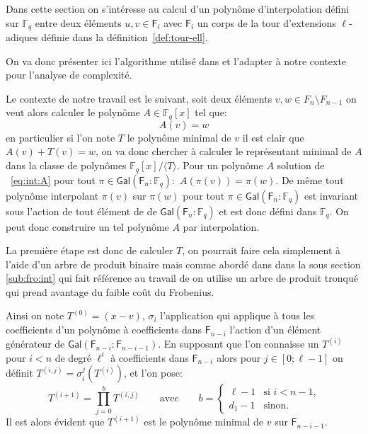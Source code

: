 \documentclass[10pt,a4paper]{book}
\theoremstyle{plain}
\theoremstyle{definition}
\theoremstyle{definition}
\theoremstyle{definition}
\theoremstyle{definition}
\theoremstyle{remark}
\theoremstyle{remark}
\theoremstyle{definition}
\begin{document}
Dans cette section on s'intéresse au calcul d'un polynôme d'interpolation défini
 sur $\mathbb{F}_q$ entre deux éléments $u,v \in \mathsf{F}_i$ avec 
 $\mathsf{F}_i$ un corps de la tour d'extensions $\ell$-adiques 
  définie dans la définition~\ref{def:tour-ell}.  
  
  
 On va donc présenter ici l'algorithme utilisé dans \cite[8.7]{DeFeo10} et
 l'adapter à notre contexte pour l'analyse de complexité. 


Le contexte de notre travail est le suivant, soit deux éléments $v,w \in F_n
\setminus F_{n-1}$ on veut alors calculer le polynôme $A \in \mathbb{F}_q[x]$ 
tel que:
\begin{equation}
\label{eq:int:A}
A(v)=w
\end{equation}
en particulier si l'on note $T$ le polynôme minimal de $v$ il est clair que 
 $A(v)+T(v)=w$, on va donc chercher à calculer le représentant minimal de 
$A$ dans la classe de polynômes $\mathbb{F}_q[x]/ \langle T \rangle$.
Pour un polynôme $A$ solution de ~\ref{eq:int:A} pour tout 
$\pi \in \mathsf{Gal}(\mathsf{F}_n : \mathbb{F}_q):$ $A(\pi(v))=\pi(w)$. De même
tout polynôme interpolant $\pi(v)$ sur $\pi(w)$ pour tout 
$\pi \in \mathsf{Gal}(\mathsf{F}_n : \mathbb{F}_q)$ est invariant sous l'action
de tout élément de de $\mathsf{Gal}(\mathsf{F}_n : \mathbb{F}_q)$ et est donc 
défini dans $\mathbb{F}_q$. On peut donc construire un tel polynôme $A$ par 
interpolation. 

La première étape est donc de calculer $T$, on pourrait faire  cela simplement 
à l'aide d'un arbre de produit binaire mais comme abordé dans dans la sous 
section \ref{sub:fro:int} qui fait référence au travail de \cite[8.7]{DeFeo10}
on utilise un arbre de produit tronqué qui prend avantage du faible coût du 
Frobenius.

Ainsi on note $T^{(0)}=(x-v)$, $\sigma_i$ l'application qui applique à tous les
 coefficients d'un polynôme à coefficients dans $\mathsf{F}_{n-i}$ l'action 
 d'un élément générateur de $\mathsf{Gal}(\mathsf{F}_{n-i} : \mathsf{F}_{n-i-1})$. En 
 supposant que l'on connaisse un $T^{(i)}$ pour $i < n$ de degré $\ell^i$ à 
 coefficients dans $\mathsf{F}_{n-i}$ alors pour $j \in [0 ; \ell-1]$ on définit
 $T^{(i,j)}=\sigma_i^j(T^{(i)})$, et l'on pose:  
\begin{equation*}
T^{(i+1)}=\prod_{j=0}^bT^{(i,j)} \qquad\text{avec}\qquad
  b = \begin{cases}
    \ell-1 &\text{si $i<n-1$,}\\
    d_1-1 &\text{sinon.}
  \end{cases}
\end{equation*}
Il est alors évident que $T^{(i+1)}$ est le polynôme minimal de $v$ sur 
$\mathsf{F}_{n-i-1}$.
\end{document}
